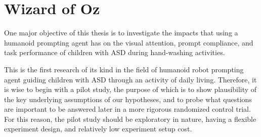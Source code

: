 \chapter{Wizard of Oz}


One major objective of this thesis is to investigate the impacts that using a humanoid prompting agent has on the visual attention, prompt compliance, and task performance of children with ASD during hand-washing activities.

This is the first research of its kind in the field of humanoid robot prompting agent guiding children with ASD through an activity of daily living.  Therefore, it is wise to begin with a pilot study, the purpose of which is to show plausibility of the key underlying assumptions of our hypotheses, and to probe what questions are important to be answered later in a more rigorous randomized control trial.  For this reason, the pilot study should be exploratory in nature, having a flexible experiment design, and relatively low experiment setup cost.











